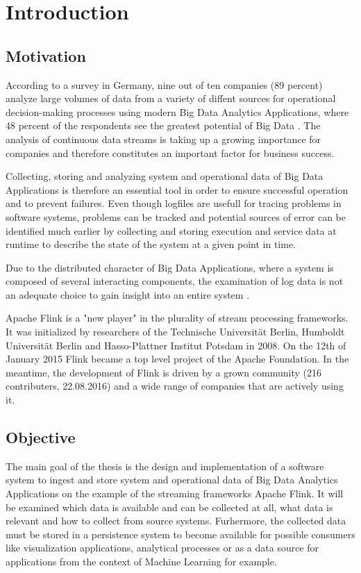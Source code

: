 \chapter{Introduction}

\section{Motivation}
According to a survey in Germany, nine out of ten companies (89 percent) analyze large
volumes of data from a variety of diffent sources for operational decision-making processes
using modern Big Data Analytics Applications, where 48 percent of the respondents see
the greatest potential of Big Data \cite{Bitk14}. The analysis of continuous data streams is
taking up a growing importance for companies and therefore constitutes an important
factor for business success.

Collecting, storing and analyzing system and operational data of Big Data Applications is
therefore an essential tool in order to ensure successful operation and to prevent failures.
Even though logfiles are usefull for tracing problems in software systems, problems can
be tracked and potential sources of error can be identified much earlier by collecting and
storing execution and service data at runtime to describe the state of the system at a
given point in time.

Due to the distributed character of Big Data Applications, where a system is composed
of several interacting components, the examination of log data is not an adequate choice
to gain insight into an entire system \cite{VanL14}.

Apache Flink is a "new player" in the plurality of stream processing frameworks. It was
initialized by researchers of the Technische Universität Berlin, Humboldt Universität
Berlin and Hasso-Plattner Institut Potsdam in 2008. On the 12th of January 2015 Flink
became a top level project of the Apache Foundation. In the meantime, the development of
Flink is driven by a grown community (216 contributers, 22.08.2016) and a wide range of
companies that are actively using it.

\section{Objective}

The main goal of the thesis is the design and implementation of a software system to ingest
and  store system and operational data of Big Data Analytics Applications on the example
of the streaming frameworks Apache Flink. It will be examined which data is available and
can be collected at all, what data is relevant and how to collect from source systems.
Furhermore, the collected data must be stored in a persistence system to become available
for possible consumers like visualization applications, analytical processes or as a data
source for applications from the context of Machine Learning for example.

